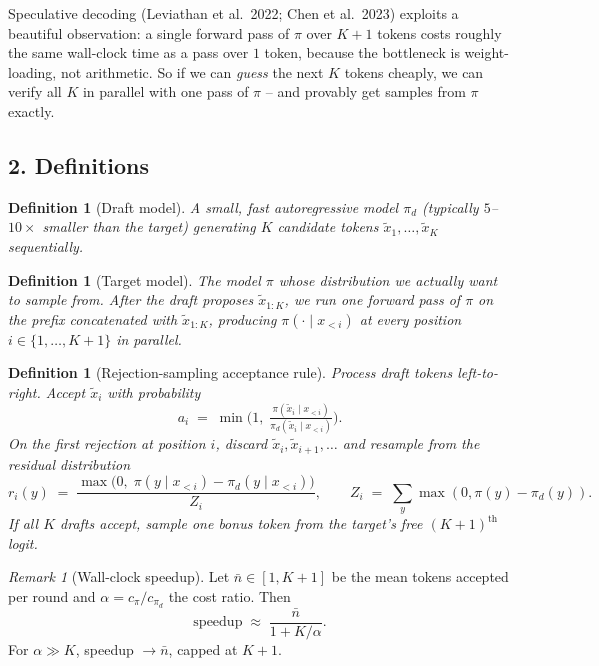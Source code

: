 \documentclass[11pt]{article}
\newtheorem{definition}[theorem]{Definition}
\theoremstyle{remark}
\newtheorem{remark}[theorem]{Remark}
\begin{document}
Speculative decoding (Leviathan et al.\ 2022; Chen et al.\ 2023) exploits a beautiful observation: a single forward pass of $\pi$ over $K+1$ tokens costs roughly the same wall-clock time as a pass over $1$ token, because the bottleneck is weight-loading, not arithmetic. So if we can \emph{guess} the next $K$ tokens cheaply, we can verify all $K$ in parallel with one pass of $\pi$ -- and provably get samples from $\pi$ exactly.

\subsection*{2. Definitions}

\begin{definition}[Draft model]
A small, fast autoregressive model $\pi_d$ (typically $5$--$10\times$ smaller than the target) generating $K$ candidate tokens $\tilde x_1, \ldots, \tilde x_K$ sequentially.
\end{definition}

\begin{definition}[Target model]
The model $\pi$ whose distribution we actually want to sample from. After the draft proposes $\tilde x_{1:K}$, we run one forward pass of $\pi$ on the prefix concatenated with $\tilde x_{1:K}$, producing $\pi(\cdot \mid x_{<i})$ at every position $i \in \{1,\ldots,K+1\}$ in parallel.
\end{definition}

\begin{definition}[Rejection-sampling acceptance rule]
Process draft tokens left-to-right. Accept $\tilde x_i$ with probability
\[
a_i \;=\; \min\!\Big(1,\; \tfrac{\pi(\tilde x_i \mid x_{<i})}{\pi_d(\tilde x_i \mid x_{<i})}\Big).
\]
On the \emph{first} rejection at position $i$, discard $\tilde x_i, \tilde x_{i+1}, \ldots$ and resample from the residual distribution
\[
r_i(y) \;=\; \frac{\max\!\big(0,\; \pi(y \mid x_{<i}) - \pi_d(y \mid x_{<i})\big)}{Z_i}, \qquad Z_i \;=\; \sum_y \max(0, \pi(y) - \pi_d(y)).
\]
If all $K$ drafts accept, sample one bonus token from the target's free $(K{+}1)^{\text{th}}$ logit.
\end{definition}

\begin{remark}[Wall-clock speedup]
Let $\bar n \in [1, K+1]$ be the mean tokens accepted per round and $\alpha = c_\pi / c_{\pi_d}$ the cost ratio. Then
\[
\text{speedup} \;\approx\; \frac{\bar n}{1 + K/\alpha}.
\]
For $\alpha \gg K$, speedup $\to \bar n$, capped at $K+1$.
\end{remark}
\end{document}
